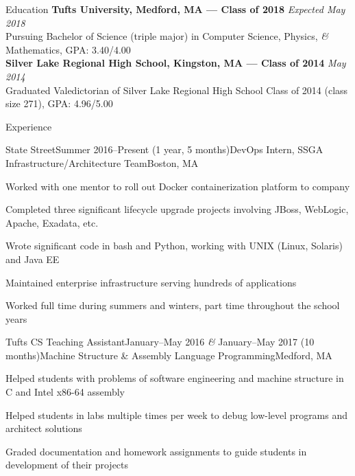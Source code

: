 \documentclass{resume}
\begin{document}
  \begin{rSection}{Education}
    {\bf Tufts University, Medford, MA --- Class of 2018} \hfill {\em Expected May 2018} \\ 
    { Pursuing Bachelor of Science (triple major) in Computer Science, Physics, \textit{\&} Mathematics, GPA: 3.40/4.00 }\\
    {\bf Silver Lake Regional High School, Kingston, MA --- Class of 2014} \hfill {\em May 2014}\\ 
    { Graduated Valedictorian of Silver Lake Regional High School Class of 2014 (class size 271), GPA: 4.96/5.00 }
  \end{rSection}

  \begin{rSection}{Experience}
    \begin{rSubsection}{State Street}{Summer 2016--Present (1 year, 5 months)}{DevOps Intern, SSGA Infrastructure/Architecture Team}{Boston, MA}
    \item Worked with one mentor to roll out Docker containerization platform to company
    \item Completed three significant lifecycle upgrade projects involving JBoss, WebLogic, Apache, Exadata, etc.
    \item Wrote significant code in bash and Python, working with UNIX (Linux, Solaris) and Java EE
    \item Maintained enterprise infrastructure serving hundreds of applications
    \item Worked full time during summers and winters, part time throughout the school years
    \end{rSubsection}

    \begin{rSubsection}{Tufts CS Teaching Assistant}{January--May 2016 \textit{\&} January--May 2017 (10 months)}{Machine Structure \& Assembly Language Programming}{Medford, MA}
    \item Helped students with problems of software engineering and machine structure in C and Intel x86-64 assembly
    \item Helped students in labs multiple times per week to debug low-level programs and architect solutions
    \item Graded documentation and homework assignments to guide students in development of their projects
    \end{rSubsection}
  \end{rSection}
\end{document}
